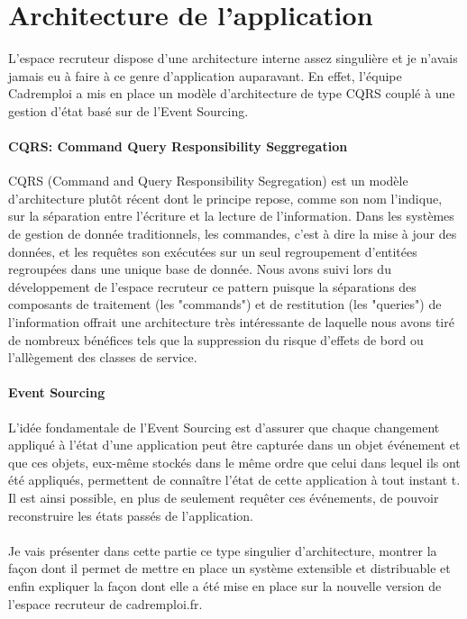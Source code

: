 \section{Architecture de l'application}
\label{sec:Architecture de l'application}
L'espace recruteur dispose d'une architecture interne assez singulière et je n'avais jamais eu à faire à ce genre d'application auparavant.
En effet, l'équipe Cadremploi a mis en place un modèle d'architecture de type CQRS couplé à une gestion d'état basé sur de l'Event Sourcing.

\paragraph{CQRS: Command Query Responsibility Seggregation}
\label{par:CQRS: Command Query Responsibility Seggregation}
CQRS (Command and Query Responsibility Segregation) est un modèle d'architecture plutôt récent dont le principe repose, comme son nom l'indique, sur la séparation entre l'écriture et la lecture de l'information.
Dans les systèmes de gestion de donnée traditionnels, les commandes, c'est à dire la mise à jour des données, et les requêtes son exécutées sur un seul regroupement d'entitées regroupées dans une unique base de donnée.
Nous avons suivi lors du développement de l'espace recruteur ce pattern puisque la séparations des composants de traitement (les "commands") et de restitution (les "queries") de l'information offrait une architecture très intéressante de laquelle nous avons tiré de nombreux bénéfices tels que la suppression du risque d'effets de bord ou l'allègement des classes de service.

\paragraph{Event Sourcing}
\label{par:Event Sourcing}
L'idée fondamentale de l'Event Sourcing est d'assurer que chaque changement appliqué à l'état d'une application peut être capturée dans un objet événement et que ces objets, eux-même stockés dans le même ordre que celui dans lequel ils ont été appliqués, permettent de connaître l'état de cette application à tout instant t.
Il est ainsi possible, en plus de seulement requêter ces événements, de pouvoir reconstruire les états passés de l'application.

\paragraph{}
Je vais présenter dans cette partie ce type singulier d'architecture, montrer la façon dont il permet de mettre en place un système extensible et distribuable et enfin expliquer la façon dont elle a été mise en place sur la nouvelle version de l'espace recruteur de cadremploi.fr.



